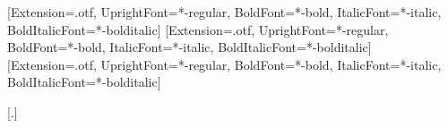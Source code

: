 \usepackage{amsmath,amssymb}
\usepackage{fontspec}
\setmainfont{texgyretermes}[Extension=.otf, UprightFont=*-regular, BoldFont=*-bold,
  ItalicFont=*-italic, BoldItalicFont=*-bolditalic]
\setsansfont{texgyreheros}[Extension=.otf, UprightFont=*-regular, BoldFont=*-bold,
  ItalicFont=*-italic, BoldItalicFont=*-bolditalic]
\setmonofont{texgyrecursor}[Extension=.otf, UprightFont=*-regular, BoldFont=*-bold,
  ItalicFont=*-italic, BoldItalicFont=*-bolditalic]
\usepackage{babel}

\usepackage[a4paper,margin=2.5cm]{geometry}
\usepackage{graphicx}
\graphicspath{{figures/}{../results/figures/}}   %
\usepackage{booktabs,multirow,array,tabularx,makecell}
\usepackage[table]{xcolor}
\usepackage[section]{placeins}   %
\usepackage{caption}
\usepackage{enumitem}
\usepackage{titlesec}
\titleformat{\section}{\large\bfseries}{\thesection}{0.6em}{}
\titleformat{\subsection}{\normalsize\bfseries}{\thesubsection}{0.6em}{}
\titleformat{\subsubsection}[runin]{\normalsize\bfseries}{\thesubsubsection}{0.5em}{}[.]
\titlespacing*{\section}{0pt}{14pt}{6pt}
\titlespacing*{\subsection}{0pt}{10pt}{4pt}
\usepackage{tikz}
\usetikzlibrary{positioning,arrows.meta,fit}
\usepackage[numbers,sort&compress]{natbib}   %
\usepackage[colorlinks=true,linkcolor=blue!50!black,citecolor=blue!50!black,urlcolor=blue!50!black]{hyperref}

